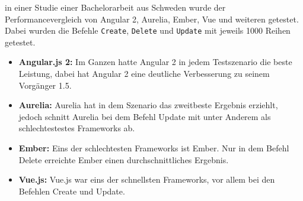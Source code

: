 in einer Studie einer Bachelorarbeit aus Schweden wurde der Performancevergleich von Angular 2, Aurelia,  Ember, Vue und weiteren getestet. Dabei wurden die Befehle \texttt{Create}, \texttt{Delete} und \texttt{Update} mit jeweils 1000 Reihen getestet.\cite{Svensson2015}
\begin{itemize}
\item \textbf{Angular.js 2:} Im Ganzen hatte Angular 2 in jedem Testszenario die beste Leistung, dabei hat Angular 2 eine deutliche Verbesserung zu seinem Vorg\"anger 1.5\cite{Svensson2015}.
\item \textbf{Aurelia:} Aurelia hat in dem Szenario das zweitbeste Ergebnis erziehlt, jedoch schnitt Aurelia bei dem Befehl Update mit unter Anderem als schlechtestestes Frameworks ab\cite{Svensson2015}.
\item \textbf{Ember:} Eins der schlechtesten Frameworks ist Ember. Nur in dem Befehl Delete erreichte Ember einen durchschnittliches Ergebnis\cite{Svensson2015}.
\item \textbf{Vue.js:} Vue.js war eins der schnellsten Frameworks, vor allem bei den Befehlen Create und Update\cite{Svensson2015}.
\end{itemize}

